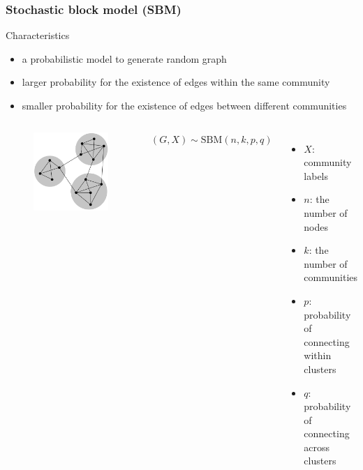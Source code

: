 \documentclass[notheorems]{beamer}
\begin{document}
\begin{frame}
\frametitle{Stochastic block model (SBM)}
\begin{block}{Characteristics}
\begin{itemize}
\item a probabilistic model to generate random graph
\item larger probability for the existence of edges within the same community
\item smaller probability for the existence of edges between different communities
\end{itemize}
\end{block}
\begin{columns}
		\begin{figure}
		\includegraphics[width=\textwidth]{sbm.png}
	\end{figure}
\quad$(G,X)\sim \textrm{SBM}(n, k, p, q)$
\begin{itemize}
	\item $X$: community labels
	\item $n$: the number of nodes
	\item $k$: the number of communities
	\item $p$: probability of connecting within clusters
	\item $q$: probability of connecting across clusters
\end{itemize}
\end{columns}
\end{frame}
\end{document}

